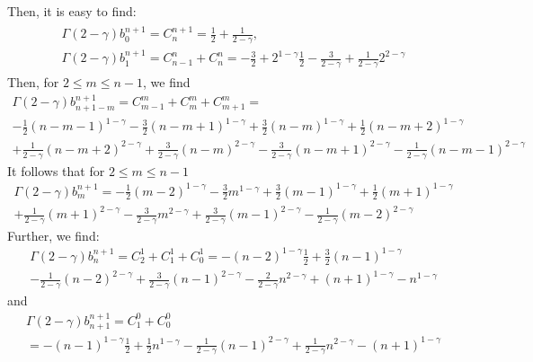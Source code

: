 \documentclass[11pt]{article}
\begin{document}
Then, it is easy to find:
\begin{gather}
\begin{array}{c}
\Gamma(2-\gamma)b_{0}^{n+1}=C_n^{n+1}=\frac{1}{2}+\frac{1}{2-\gamma},\\
\Gamma(2-\gamma)b_1^{n+1}=C_{n-1}^n+C_n^n=-\frac{3}{2}+2^{1-\gamma}\frac{1}{2}
-\frac{3}{2-\gamma}+\frac{1}{2-\gamma}2^{2-\gamma}
 \end{array}
\end{gather}
Then, for $2\le m\le n-1$, we find
\begin{multline*}
\Gamma(2-\gamma)b_{n+1-m}^{n+1}=C_{m-1}^m+C_m^m+C_{m+1}^m
=\\
-\frac{1}{2}(n-m-1)^{1-\gamma}-\frac{3}{2}(n-m+1)^{1-\gamma}+\frac{3}{2}(n-m)^{1-\gamma}+\frac{1}{2}(n-m+2)^{1-\gamma}\\
+\frac{1}{2-\gamma}(n-m+2)^{2-\gamma}
+\frac{3}{2-\gamma}(n-m)^{2-\gamma}
-\frac{3}{2-\gamma}(n-m+1)^{2-\gamma}
-\frac{1}{2-\gamma}(n-m-1)^{2-\gamma}
\end{multline*}
It follows that for $2\le m\le n-1$
\begin{multline}
\Gamma(2-\gamma)b_{m}^{n+1}=
-\frac{1}{2}(m-2)^{1-\gamma}-\frac{3}{2}m^{1-\gamma}+\frac{3}{2}(m-1)^{1-\gamma}+\frac{1}{2}(m+1)^{1-\gamma}\\
+\frac{1}{2-\gamma}(m+1)^{2-\gamma}
-\frac{3}{2-\gamma}m^{2-\gamma}
+\frac{3}{2-\gamma}(m-1)^{2-\gamma}
-\frac{1}{2-\gamma}(m-2)^{2-\gamma}
\end{multline}
Further, we find:
\begin{multline}
\Gamma(2-\gamma)b_n^{n+1}=C_2^1+C_1^1+C_0^1
=-(n-2)^{1-\gamma}\frac{1}{2}+\frac{3}{2}(n-1)^{1-\gamma}\\
-\frac{1}{2-\gamma}(n-2)^{2-\gamma}+\frac{3}{2-\gamma}(n-1)^{2-\gamma}
-\frac{2}{2-\gamma}n^{2-\gamma}+(n+1)^{1-\gamma}-n^{1-\gamma}
\end{multline}
and
\begin{multline}
\Gamma(2-\gamma)b_{n+1}^{n+1}=C_1^0+C_0^0\\
=-(n-1)^{1-\gamma}\frac{1}{2}+\frac{1}{2}n^{1-\gamma}
-\frac{1}{2-\gamma}(n-1)^{2-\gamma}+\frac{1}{2-\gamma}n^{2-\gamma}
-(n+1)^{1-\gamma}
\end{multline}
\end{document}
